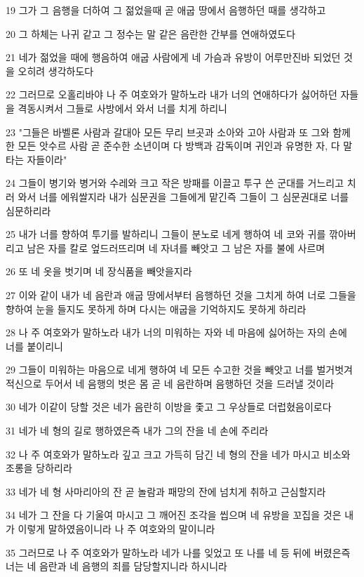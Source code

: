 \par 19 그가 그 음행을 더하여 그 젊었을때 곧 애굽 땅에서 음행하던 때를 생각하고
\par 20 그 하체는 나귀 같고 그 정수는 말 같은 음란한 간부를 연애하였도다
\par 21 네가 젊었을 때에 행음하여 애굽 사람에게 네 가슴과 유방이 어루만진바 되었던 것을 오히려 생각하도다
\par 22 그러므로 오홀리바야 나 주 여호와가 말하노라 내가 너의 연애하다가 싫어하던 자들을 격동시켜서 그들로 사방에서 와서 너를 치게 하리니
\par 23 "그들은 바벨론 사람과 갈대아 모든 무리 브곳과 소아와 고아 사람과 또 그와 함께 한 모든 앗수르 사람 곧 준수한 소년이며 다 방백과 감독이며 귀인과 유명한 자, 다 말 타는 자들이라"
\par 24 그들이 병기와 병거와 수레와 크고 작은 방패를 이끌고 투구 쓴 군대를 거느리고 치러 와서 너를 에워쌀지라 내가 심문권을 그들에게 맡긴즉 그들이 그 심문권대로 너를 심문하리라
\par 25 내가 너를 향하여 투기를 발하리니 그들이 분노로 네게 행하여 네 코와 귀를 깎아버리고 남은 자를 칼로 엎드러뜨리며 네 자녀를 빼앗고 그 남은 자를 불에 사르며
\par 26 또 네 옷을 벗기며 네 장식품을 빼앗을지라
\par 27 이와 같이 내가 네 음란과 애굽 땅에서부터 음행하던 것을 그치게 하여 너로 그들을 향하여 눈을 들지도 못하게 하며 다시는 애굽을 기억하지도 못하게 하리라
\par 28 나 주 여호와가 말하노라 내가 너의 미워하는 자와 네 마음에 싫어하는 자의 손에 너를 붙이리니
\par 29 그들이 미워하는 마음으로 네게 행하여 네 모든 수고한 것을 빼앗고 너를 벌거벗겨 적신으로 두어서 네 음행의 벗은 몸 곧 네 음란하며 음행하던 것을 드러낼 것이라
\par 30 네가 이같이 당할 것은 네가 음란히 이방을 좇고 그 우상들로 더럽혔음이로다
\par 31 네가 네 형의 길로 행하였은즉 내가 그의 잔을 네 손에 주리라
\par 32 나 주 여호와가 말하노라 깊고 크고 가득히 담긴 네 형의 잔을 네가 마시고 비소와 조롱을 당하리라
\par 33 네가 네 형 사마리아의 잔 곧 놀람과 패망의 잔에 넘치게 취하고 근심할지라
\par 34 네가 그 잔을 다 기울여 마시고 그 깨어진 조각을 씹으며 네 유방을 꼬집을 것은 내가 이렇게 말하였음이니라 나 주 여호와의 말이니라
\par 35 그러므로 나 주 여호와가 말하노라 네가 나를 잊었고 또 나를 네 등 뒤에 버렸은즉 너는 네 음란과 네 음행의 죄를 담당할지니라 하시니라
